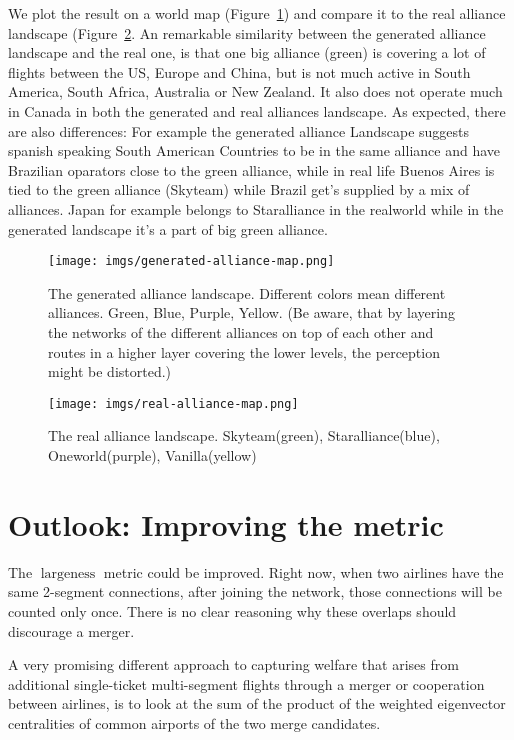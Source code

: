 \documentclass[twocolumn]{tum-article}
\DeclareMathOperator{\Largeness}{largeness}
\begin{document}
We plot the result on a world map (Figure~\ref{fig:generated-alliance-map}) and compare it to the real alliance landscape (Figure~\ref{fig:real-alliance-map}. An remarkable similarity between the generated alliance landscape and the real one, is that one big alliance (green) is covering a lot of flights between the US, Europe and China, but is not much active in South America, South Africa, Australia or New Zealand. It also does not operate much in Canada in both the generated and real alliances landscape. 
As expected, there are also differences: For example the generated alliance Landscape suggests spanish speaking South American Countries to be in the same alliance and have Brazilian oparators close to the green alliance, while in real life Buenos Aires is tied to the green alliance (Skyteam) while Brazil get's supplied by a mix of alliances. Japan for example belongs to Staralliance in the realworld while in the generated landscape it's a part of big green alliance. 

\begin{figure}
	\centering
	\texttt{[image: imgs/generated-alliance-map.png]}
	\caption{
The generated alliance landscape. Different colors mean different alliances. Green, Blue, Purple, Yellow. (Be aware, that by layering the networks of the different alliances on top of each other and routes in a higher layer covering the lower levels, the perception might be distorted.)}
	\label{fig:generated-alliance-map}
\end{figure}

\begin{figure}
	\centering
	\texttt{[image: imgs/real-alliance-map.png]}
	\caption{
The real alliance landscape. Skyteam(green), Staralliance(blue), Oneworld(purple), Vanilla(yellow)}
	\label{fig:real-alliance-map}
\end{figure}

\section{Outlook: Improving the metric}
The $\Largeness$ metric could be improved. Right now, when two airlines have the same 2-segment connections, after joining the network, those connections will be counted only once. There is no clear reasoning why these overlaps should discourage a merger. 

A very promising different approach to capturing welfare that arises from additional single-ticket multi-segment flights through a merger or cooperation between airlines, is to look at the sum of the product of the weighted eigenvector centralities of common airports of the two merge candidates. 
\end{document}
